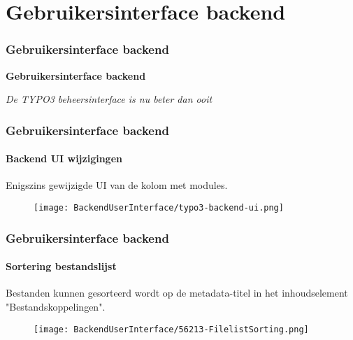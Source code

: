 %

\section{Gebruikersinterface backend}
\begin{frame}[fragile]
	\frametitle{Gebruikersinterface backend}

	\begin{center}\huge{\color{typo3darkgrey}\textbf{Gebruikersinterface backend}}\end{center}
	\begin{center}\large{\textit{De TYPO3 beheersinterface is nu beter dan ooit}}\end{center}

\end{frame}


\begin{frame}[fragile]
	\frametitle{Gebruikersinterface backend}
	\framesubtitle{Backend UI wijzigingen}

	Enigszins gewijzigde UI van de kolom met modules.

	\begin{figure}
		\texttt{[image: BackendUserInterface/typo3-backend-ui.png]}
	\end{figure}

\end{frame}


\begin{frame}[fragile]
	\frametitle{Gebruikersinterface backend}
	\framesubtitle{Sortering bestandslijst}

	Bestanden kunnen gesorteerd wordt op de metadata-titel in het inhoudselement "Bestandskoppelingen".

	\begin{figure}
		\texttt{[image: BackendUserInterface/56213-FilelistSorting.png]}
	\end{figure}

\end{frame}

